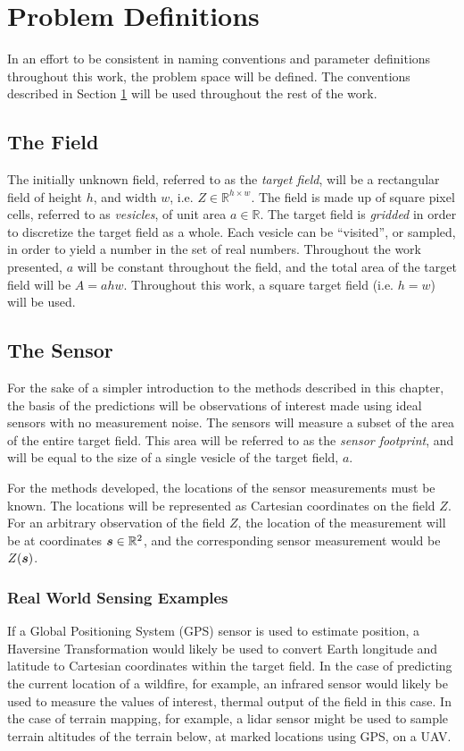 \chapter{Problem Definitions} \label{ch:defs}
In an effort to be consistent in naming conventions and parameter definitions throughout this work, the problem space will be defined. The conventions described in Section \ref{ch:defs} will be used throughout the rest of the work.

\section{The Field}
The initially unknown field, referred to as the \textit{target field}, will be a rectangular field of height $h$, and width $w$, i.e. $Z \in \mathbb{R}^{h \times w}$. The field is made up of square pixel cells, referred to as \textit{vesicles}, of unit area $a \in \mathbb{R}$. The target field is \textit{gridded} in order to discretize the target field as a whole. Each vesicle can be ``visited'', or sampled, in order to yield a number in the set of real numbers. Throughout the work presented, $a$ will be constant throughout the field, and the total area of the target field will be $A = ahw$. Throughout this work, a square target field (i.e. $h = w$) will be used.

\section{The Sensor} \label{sec:sensor_measurements}
For the sake of a simpler introduction to the methods described in this chapter, the basis of the predictions will be observations of interest made using ideal sensors with no measurement noise. The sensors will measure a subset of the area of the entire target field. This area will be referred to as the \textit{sensor footprint}, and will be equal to the size of a single vesicle of the target field, $a$.

For the methods developed, the locations of the sensor measurements must be known. The locations will be represented as Cartesian coordinates on the field $Z$. For an arbitrary observation of the field $Z$, the location of the measurement will be at coordinates ${\it{\boldsymbol{s}}} \in \mathbb{R}^2$, and the corresponding sensor measurement would be $Z({\it{\boldsymbol{s}}})$.

\subsection{Real World Sensing Examples}
If a Global Positioning System (GPS) sensor is used to estimate position, a Haversine Transformation would likely be used to convert Earth longitude and latitude to Cartesian coordinates within the target field. In the case of predicting the current location of a wildfire, for example, an infrared sensor would likely be used to measure the values of interest, thermal output of the field in this case. In the case of terrain mapping, for example, a lidar sensor might be used to sample terrain altitudes of the terrain below, at marked locations using GPS, on a UAV.
